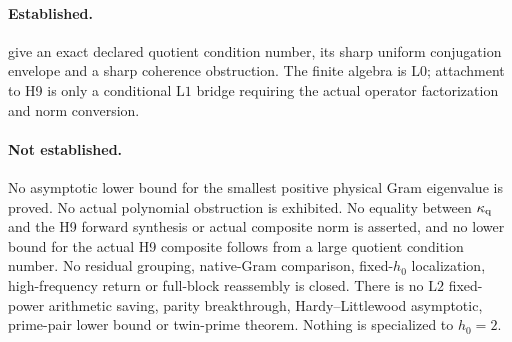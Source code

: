 \documentclass[11pt]{article}
\theoremstyle{definition}
\theoremstyle{remark}
\newcommand{\Lzero}{\mathrm{L0}}
\newcommand{\Lone}{\mathrm{L1}}
\newcommand{\Ltwo}{\mathrm{L2}}
\begin{document}
\paragraph{Established.}
 give an exact declared
quotient condition number, its sharp uniform conjugation envelope and
a sharp coherence obstruction.  The finite algebra is \(\Lzero\);
attachment to H9 is only a conditional \(\Lone\) bridge requiring the
actual operator factorization and norm conversion.

\paragraph{Not established.}
No asymptotic lower bound for the smallest positive physical Gram
eigenvalue is proved.  No actual polynomial obstruction is exhibited.
No equality between \(\kappa_{\rm q}\) and the H9 forward synthesis
or actual composite norm is asserted, and no lower bound for the
actual H9 composite follows from a large quotient condition number.
No residual grouping, native-Gram comparison, fixed-\(h_0\)
localization, high-frequency return or full-block reassembly is
closed.  There is no \(\Ltwo\) fixed-power arithmetic saving, parity
breakthrough, Hardy--Littlewood asymptotic, prime-pair lower bound or
twin-prime theorem.  Nothing is specialized to \(h_0=2\).

\begingroup
\small
\setlength{\bibsep}{2pt plus 0.3ex}
\sloppy


\endgroup
\end{document}
